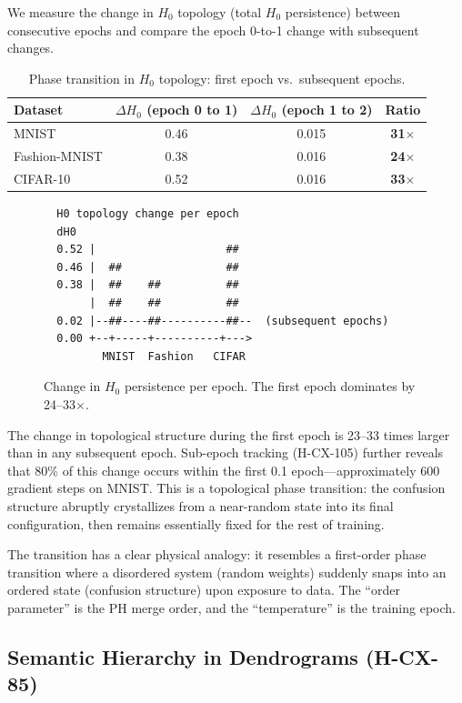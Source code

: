 \documentclass[11pt,a4paper]{article}
\begin{document}
We measure the change in $H_0$ topology (total $H_0$ persistence) between consecutive epochs and compare the epoch 0-to-1 change with subsequent changes.

\begin{table}[htbp]
\centering
\caption{Phase transition in $H_0$ topology: first epoch vs.\ subsequent epochs.}
\label{tab:phase-transition}
\begin{tabular}{lccc}
\toprule
Dataset & $\Delta H_0$ (epoch 0 to 1) & $\Delta H_0$ (epoch 1 to 2) & Ratio \\
\midrule
MNIST         & 0.46 & 0.015 & \textbf{31$\times$} \\
Fashion-MNIST & 0.38 & 0.016 & \textbf{24$\times$} \\
CIFAR-10      & 0.52 & 0.016 & \textbf{33$\times$} \\
\bottomrule
\end{tabular}
\end{table}

\begin{figure}[htbp]
\centering
\begin{verbatim}
  H0 topology change per epoch
  dH0
  0.52 |                    ##
  0.46 |  ##                ##
  0.38 |  ##    ##          ##
       |  ##    ##          ##
  0.02 |--##----##----------##--  (subsequent epochs)
  0.00 +--+-----+----------+--->
         MNIST  Fashion   CIFAR
\end{verbatim}
\caption{Change in $H_0$ persistence per epoch. The first epoch dominates by 24--33$\times$.}
\label{fig:phase-transition}
\end{figure}

The change in topological structure during the first epoch is 23--33 times larger than in any subsequent epoch. Sub-epoch tracking (H-CX-105) further reveals that 80\% of this change occurs within the first 0.1 epoch---approximately 600 gradient steps on MNIST. This is a topological phase transition: the confusion structure abruptly crystallizes from a near-random state into its final configuration, then remains essentially fixed for the rest of training.

The transition has a clear physical analogy: it resembles a first-order phase transition where a disordered system (random weights) suddenly snaps into an ordered state (confusion structure) upon exposure to data. The ``order parameter'' is the PH merge order, and the ``temperature'' is the training epoch.

\subsection{Semantic Hierarchy in Dendrograms (H-CX-85)}
\end{document}
